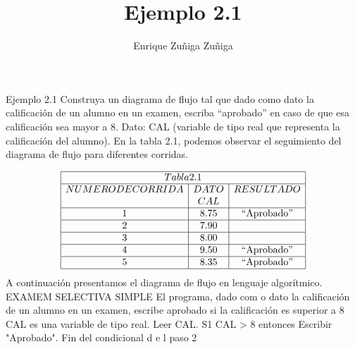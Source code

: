 \documentclass[11pt]{amsart}
\title{ Ejemplo 2.1}
\author{Enrique Zuñiga Zuñiga}
\begin{document}
\maketitle
Ejemplo 2.1\newline
Construya un diagrama de flujo tal que dado como dato la calificación de un alumno en un examen, escriba “aprobado” en caso de que esa calificación sea mayor a 8.\newline\newline
Dato: CAL (variable de tipo real que representa la calificación del alumno).\newline\newline
En la tabla 2.1, podemos observar el seguimiento del diagrama de flujo para
diferentes corridas.\newline


$$
\begin{array}{|c|c|c|}
\hline
 \multicolumn{3}{|c|}{Tabla 2.1}\\
\hline
NUMERO DECORRIDA & DATO & RESULTADO \\
 & CAL &  \\
\hline
1 & 8.75 & \text{``Aprobado''} \\
\hline
2 & 7.90 &  \\
\hline
3 & 8.00 &  \\
\hline
4 & 9.50 & \text{``Aprobado''} \\
\hline
5 & 8.35 & \text{``Aprobado''} \\
\hline
\end{array}
$$\newline\newline
A continuación presentamos el diagrama de flujo en lenguaje algorítmico.\newline\newline
EXAMEM SELECTIVA SIMPLE\newline
El programa, dado com o dato la calificación de un alumno en un examen, escribe aprobado si la calificación es superior a 8 CAL es una variable de tipo real. Leer CAL. S1 CAL > 8 entonces\newline
Escribir "Aprobado". Fin del condicional d e l paso 2 \newline

\end{document}
